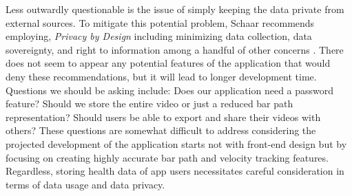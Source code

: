 \documentclass[10pt,twocolumn]{article}
\begin{document}
Less outwardly questionable is the issue of simply keeping the data private from external sources.
To mitigate this potential problem, Schaar recommends employing, \textit{Privacy by Design} including minimizing data collection, data sovereignty, and right to information among a handful of other concerns \cite{Schaar2010}. 
There does not seem to appear any potential features of the application that would deny these recommendations, but it will lead to longer development time.
Questions we should be asking include: Does our application need a password feature? Should we store the entire video or just a reduced bar path representation? Should users be able to export and share their videos with others?
These questions are somewhat difficult to address considering the projected development of the application starts not with front-end design but by focusing on creating highly accurate bar path and velocity tracking features.
Regardless, storing health data of app users necessitates careful consideration in terms of data usage and data privacy.

\printbibliography 
\end{document}
